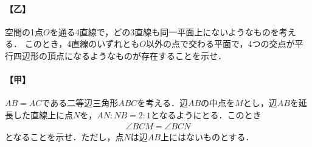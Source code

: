 \documentclass[../../main.tex]{subfiles}
\begin{document}
\paragraph{【乙】}
空間の1点$O$を通る4直線で，どの3直線も同一平面上にないようなものを考える．
このとき，4直線のいずれとも$O$以外の点で交わる平面で，4つの交点が平行四辺形の頂点になるようなものが存在することを示せ．

\paragraph{【甲】}
$AB=AC$である二等辺三角形$ABC$を考える．辺$AB$の中点を$M$とし，辺$AB$を延長した直線上に点$N$を，$AN:NB=2:1$となるようにとる．このとき
\begin{align}
  \angle BCM = \angle BCN
\end{align}
となることを示せ．ただし，点$N$は辺$AB$上にはないものとする．
\end{document}
